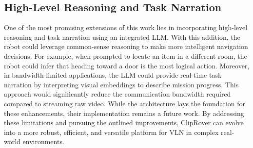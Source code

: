 \subsection{High-Level Reasoning and Task Narration}
\vspace{-1mm}
One of the most promising extensions of this work lies in incorporating high-level reasoning and task narration using an integrated LLM. With this addition, the robot could leverage common-sense reasoning to make more intelligent navigation decisions. For example, when prompted to locate an item in a different room, the robot could infer that heading toward a door is the most logical action. Moreover, in bandwidth-limited applications, the LLM could provide real-time task narration by interpreting visual embeddings to describe mission progress. This approach would significantly reduce the communication bandwidth required compared to streaming raw video. While the architecture lays the foundation for these enhancements, their implementation remains a future work. By addressing these limitations and pursuing the outlined improvements, ClipRover can evolve into a more robust, efficient, and versatile platform for VLN in complex real-world environments.

